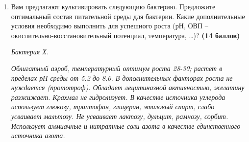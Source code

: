 \begin{enumerate}
    \item Вам предлагают культивировать следующию бактерию. Предложите оптимальный состав питательной среды для бактерии. Какие дополнительные условия необходимо выполнить для успешного роста (рН, ОВП – окислительно-восстановительный потенциал, температура, \dots)? \textbf{(14 баллов)}
    
    \textit{Бактерия Х.}

    \textit{Облигатный аэроб, температурный оптимум роста 28-30; растет в пределах рН среды от 5.2 до 8.0. В дополнительных факторах роста не нуждается (прототроф). Обладает лецитиназной активностью, желатину разжижает. Крахмал не гидролизует. В качестве источника углерода использует глюкозу, триптофан, глицерин, этиловый спирт, слабо усваивает мальтозу. Не усваивает лактозу, дульцит, рамнозу, сорбит. Использует аммиачные и нитратные соли азота в качестве единственного источника азота.}

\end{enumerate}